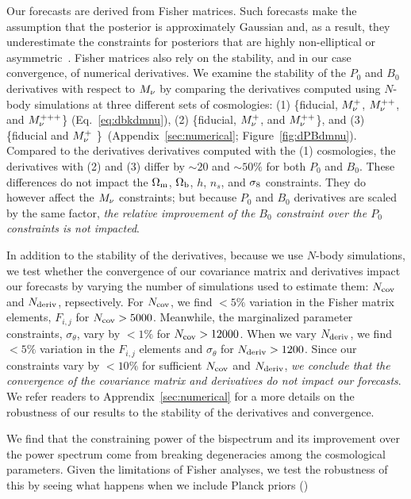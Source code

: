 Our forecasts are derived from Fisher matrices. Such forecasts make 
the assumption that the posterior is approximately Gaussian and, as a result, 
they underestimate the constraints for posteriors that are highly 
non-elliptical or asymmetric~\cite{wolz2012}. Fisher matrices also rely 
on the stability, and in our case convergence, of numerical derivatives. 
We examine the stability of the $P_0$ and $B_0$ derivatives with respect 
to $M_\nu$ by comparing the derivatives computed using $N$-body simulations 
at three different sets of cosmologies: (1) \{fiducial, $M_\nu^{+}$, $M_\nu^{++}$, 
and $M_\nu^{+++}$\} (Eq.~\ref{eq:dbkdmnu}), (2) \{fiducial, $M_\nu^{+}$, 
and $M_\nu^{++}$\}, and (3) \{fiducial and $M_\nu^{+}$ \}~(Appendix~\ref{sec:numerical}; Figure~\ref{fig:dPBdmnu}). 
Compared to the derivatives derivatives computed with the (1) cosmologies, 
the derivatives with (2) and (3) differ by $\sim 20$ and $\sim 50\%$ for 
both $P_0$ and $B_0$. These differences do not impact the $\Omega_{\rm m}$, $\Omega_{\rm b}$, $h$, 
$n_s$, and $\sigma_8$ constraints. They do however affect the $M_\nu$ constraints; 
but because $P_0$ and $B_0$ derivatives are scaled by the same factor, 
{\em the relative improvement of the $B_0$ constraint over the $P_0$ constraints 
is not impacted}. 

In addition to the stability of the derivatives, because we use $N$-body 
simulations, we test whether the convergence of our covariance matrix and 
derivatives impact our forecasts by varying the number of simulations 
used to estimate them: $N_{\rm cov}$ and $N_{\rm deriv}$, repsectively. 
For $N_{\rm cov}$, we find $< 5\%$ variation in the Fisher matrix elements, 
$F_{i,j}$ for $N_{\rm cov} > 5000$. Meanwhile, the marginalized parameter
constraints, $\sigma_\theta$, vary by $< 1\%$ for $N_{\rm cov} > 12000$. 
When we vary $N_{\rm deriv}$, we find $< 5\%$ variation in the $F_{i,j}$ 
elements and $\sigma_\theta$ for $N_{\rm deriv} > 1200$. 
Since our constraints vary by $< 10\%$ for sufficient $N_{\rm cov}$ and 
$N_{\rm deriv}$, {\em we conclude that the convergence of the covariance matrix 
and derivatives do not impact our forecasts}. We refer readers to 
Apprendix~\ref{sec:numerical} for a more details on the robustness of 
our results to the stability of the derivatives and convergence. 

We find that the constraining power of the bispectrum and its improvement 
over the power spectrum come from breaking degeneracies among the 
cosmological parameters. Given the limitations of Fisher analyses, we 
test the robustness of this by seeing what happens when we include 
Planck priors () 

